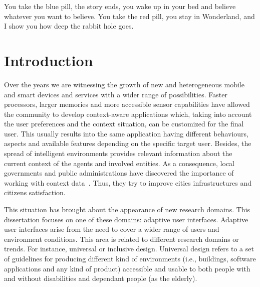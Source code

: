 \begin{savequote}[50mm]
You take the blue pill, the story ends, you wake up in your bed and believe 
whatever you want to believe. You take the red pill, you stay in Wonderland, 
and I show you how deep the rabbit hole goes.
\end{savequote}

\chapter{Introduction}
\label{cha:introduction}

\ifpdf
    \graphicspath{{1_introduction/figures/PNG/}{1_introduction/figures/PDF/}{1_introduction/figures/}}
\else
    \graphicspath{{1_introduction/figures/EPS/}{1_introduction/figures/}}
\fi


Over the years we are witnessing the growth of new and heterogeneous mobile and
smart devices and services with a wider range of possibilities. Faster processors,
larger memories and more accessible sensor capabilities have allowed the community to
develop context-aware applications which, taking into account the user preferences
and the context situation, can be customized for the final user. This usually
results into the same application having different behaviours, aspects and 
available features depending on the specific target user. Besides, the spread 
of intelligent environments provides relevant information about the current 
context of the agents and involved entities. As a consequence, local 
governments and public administrations have discovered the importance of 
working with context data~\citep{caragliu_smart_2009}. Thus, they try to 
improve cities infrastructures and citizens satisfaction.

This situation has brought about the appearance of new research domains. This 
dissertation focuses on one of these domains: adaptive user interfaces. 
Adaptive user interfaces arise from the need to cover a wider range of users 
and environment conditions. This area is related to different research domains 
or trends. For instance, universal or inclusive design. Universal design refers 
to a set of guidelines for producing different kind of environments (i.e., 
buildings, software applications and any kind of product) accessible and usable 
to both people with and without disabilities and dependant people (as the 
elderly).

